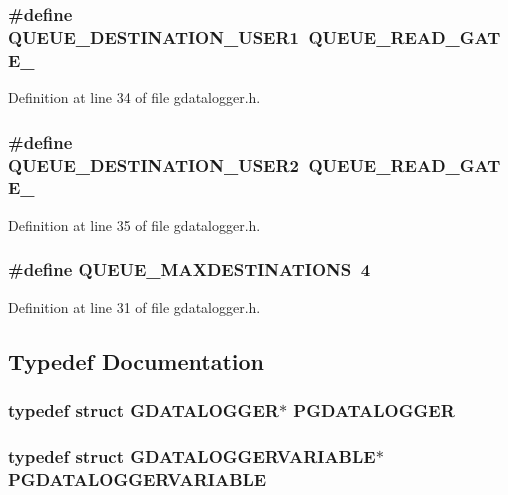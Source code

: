 \subsubsection[{QUEUE\_\-DESTINATION\_\-USER1}]{\setlength{\rightskip}{0pt plus 5cm}\#define QUEUE\_\-DESTINATION\_\-USER1~QUEUE\_\-READ\_\-GATE\_}\label{gdatalogger_8h_a846b906ef420cb120cc8ae822bf2ab80}


Definition at line 34 of file gdatalogger.h.
\subsubsection[{QUEUE\_\-DESTINATION\_\-USER2}]{\setlength{\rightskip}{0pt plus 5cm}\#define QUEUE\_\-DESTINATION\_\-USER2~QUEUE\_\-READ\_\-GATE\_}\label{gdatalogger_8h_a87a1b67f6568d2978d23385e37a6eb02}


Definition at line 35 of file gdatalogger.h.
\subsubsection[{QUEUE\_\-MAXDESTINATIONS}]{\setlength{\rightskip}{0pt plus 5cm}\#define QUEUE\_\-MAXDESTINATIONS~4}\label{gdatalogger_8h_addb46d3c73aa6e1b2a3dfb4de2211424}


Definition at line 31 of file gdatalogger.h.

\subsection{Typedef Documentation}
\subsubsection[{PGDATALOGGER}]{\setlength{\rightskip}{0pt plus 5cm}typedef  struct {\bf GDATALOGGER}$\ast$ {\bf PGDATALOGGER}}\label{gdatalogger_8h_af0f750acdddf86730aeeec5c2b5254b4}
\subsubsection[{PGDATALOGGERVARIABLE}]{\setlength{\rightskip}{0pt plus 5cm}typedef  struct {\bf GDATALOGGERVARIABLE}$\ast$ {\bf PGDATALOGGERVARIABLE}}\label{gdatalogger_8h_a6ad1b1fa4c8c70b9aa6487a0095e6a89}


